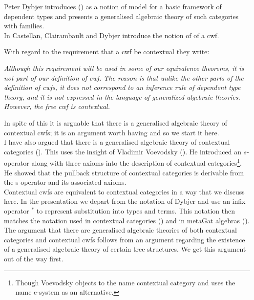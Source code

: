 	
\note
Peter Dybjer \cite{dybjer96}introduces  () as a notion of model for a basic framework of dependent types and presents a generalised algebraic theory of such categories with families. \\
\note
In \cite{CastellanClairambaultDybjer2019} 
Castellan, Clairambault and Dybjer introduce the notion of  of a cwf.


With regard to the  requirement that a cwf be contextual  they write:
\begin{tightquote}
\textit{
Although this requirement will be used in some of our equivalence theorems,
it is not part of our definition of cwf. The reason is that unlike the other
parts of the definition of cwfs, it does not correspond to an inference rule of
dependent type theory, and it is not expressed in the language of generalized
algebraic theories. However, the free cwf is contextual.}
\end{tightquote}
In spite of this it is arguable that there is a  generalised algebraic theory of contextual cwfs;
it is an argument worth having and so we start it here.\\

\note
I have also argued that there is a generalised algebraic theory of contextual categories (\cite{Cartmell86}).
This uses  the insight of Vladimir Voevodsky (\cite{Voevodsky14C}).
He  introduced an $s$-operator along with three axioms 
into the description of contextual categories\footnote{Though Voevodsky objects to the name contextual category and uses the name c-system as an alternative.}.  
He showed that the pullback structure of contextual categories is derivable 
from the s-operator and its associated axioms.  \\
\note
Contextual cwfs are equivalent to contextual categories in a way that we discuss here. 
In the presentation  we depart from the notation of Dybjer and use an infix operator $^*$ to represent substitution into types and terms. This notation then matches the notation used in contextual categories (\cite{Cartmell86}) and in metaGat algebras (\cite{Cartmell14B}). \\
\note
The argument that there are generalised algebraic theories of both contextual categories and contextual cwfs follows from an argument regarding the existence of a generalised algebraic theory of certain
tree structures. We get this argument out of the way first. \\


